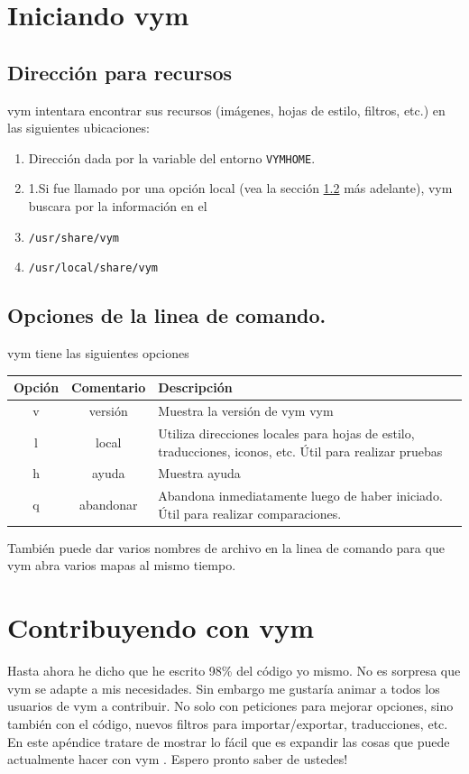 \documentclass{article}
\newcommand{\vym}{{\sc vym }}
\begin{document}
\begin{appendix}

\section{Iniciando \vym}
\subsection{Direcci\'on para recursos}
\vym intentara encontrar sus recursos (im\'agenes, hojas de estilo, filtros, etc.) en las siguientes ubicaciones:
\begin{enumerate}
	\item Direcci\'on dada por la variable del entorno {\tt VYMHOME}.
	\item 1.Si fue llamado por una opci\'on local (vea la secci\'on \ref{options} m\'as adelante), \vym buscara por la informaci\'on en el 
	\item {\tt /usr/share/vym}
	\item {\tt /usr/local/share/vym}
\end{enumerate}

\subsection{Opciones de la linea de comando.} \label{options}
\vym tiene las siguientes opciones
\begin{center}
\begin{tabular}{ccp{8cm}}\\ 
\bf Opci\'on	& \bf Comentario & \bf Descripci\'on \\ \hline
v & versi\'on & Muestra la versi\'on de \vym \vym\\
l & local	& Utiliza direcciones locales para hojas de estilo, traducciones, iconos, etc. \'Util para realizar pruebas\\
h & ayuda	& Muestra ayuda\\
q & abandonar	& Abandona inmediatamente luego de haber iniciado. \'Util para realizar comparaciones.\\
\end{tabular}
\end{center}
Tambi\'en puede dar varios nombres de archivo en la linea de comando para que \vym abra varios mapas al mismo tiempo.
 
\section{Contribuyendo con \vym}
Hasta ahora he dicho que he escrito 98\% del c\'odigo yo mismo. No es sorpresa que \vym se adapte a mis necesidades. Sin embargo me gustar\'ia animar a todos los usuarios de \vym a contribuir. No solo con peticiones para mejorar opciones, sino tambi\'en con el c\'odigo, nuevos filtros para importar/exportar, traducciones, etc. En este ap\'endice tratare de mostrar lo f\'acil que es expandir las cosas que puede actualmente hacer con \vym. Espero pronto saber de ustedes!


\end{appendix}
\end{document}
